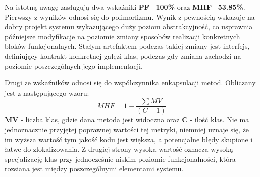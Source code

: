 Na istotną uwagę zasługują dwa wskaźniki \textbf{PF=100\%{}} oraz \linebreak \textbf{MHF=53.85\%{}}. Pierwszy z wyników odnosi się do polimorfizmu. Wynik z pewnością wskazuje na dobry projekt systemu wykazującego duży poziom abstrakcyjność, co usprawnia późniejsze modyfikacje na poziomie zmiany sposobów realizacji konkretnych bloków funkcjonalnych. Stałym artefaktem podczas takiej zmiany jest interfejs, definiujący kontrakt konkretnej gałęzi klas, podczas gdy zmiana zachodzi na poziomie poszczególnych jego implementacji.

 Drugi ze wskaźników odnosi się do współczynnika enkapsulacji metod. Obliczany jest z następującego wzoru: \[ MHF = 1 - \frac{\sum{MV}}{(C-1)} \] \textbf{MV} - liczba klas, gdzie dana metoda jest widoczna oraz \textbf{C} - ilość klas. Nie ma jednoznacznie przyjętej poprawnej wartości tej metryki, niemniej uznaje się, że im wyższa wartość tym jakość kodu jest większa, a potencjalne błędy skupione i łatwe do zlokalizowania. Z drugiej strony wysoka wartość oznacza wysoką specjalizację klas przy jednocześnie niskim poziomie funkcjonalności, która rozsiana jest między poszczególnymi elementami systemu. 